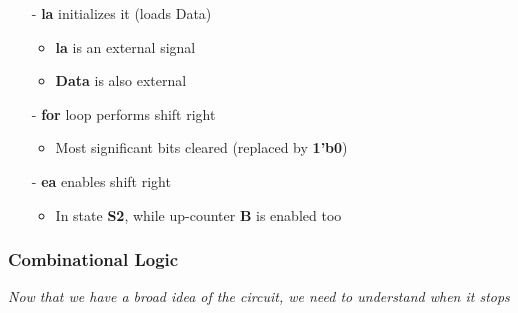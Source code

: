 \documentclass[12pt,openany]{book}
\begin{document}
\begin{minipage}[htp]{0.45\textwidth}
\begin{justify}
\begin{itemize}
	   \item[-] \textbf{la} initializes it (loads Data)
	   \begin{itemize}
		   \item \textbf{la} is an external signal
		   \item \textbf{Data} is also external
	   \end{itemize}
	   \item[-] \textbf{for} loop performs shift right
	   \begin{itemize}
		   \item Most significant bits cleared (replaced by \textbf{1'b0})
	   \end{itemize}
	   \item[-] \textbf{ea} enables shift right
	   \begin{itemize}
		   \item In state \textbf{S2}, while up-counter \textbf{B} is enabled too
	   \end{itemize}
   \end{itemize}
\end{justify}
\end{minipage}
\newline


\subsubsection{Combinational Logic}
\textit{Now that we have a broad idea of the circuit, we need to understand when it stops}\newline
\end{document}

